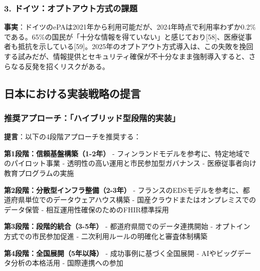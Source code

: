 \documentclass[
  a4paper,
  a4paper,
  11pt]{ltjsbook}
\begin{document}
\subsubsection{3.
ドイツ：オプトアウト方式の課題}\label{ux30c9ux30a4ux30c4ux30aaux30d7ux30c8ux30a2ux30a6ux30c8ux65b9ux5f0fux306eux8ab2ux984c}

\textbf{事実}：ドイツのePAは2021年から利用可能だが、2024年時点で利用率わずか0.2\%である。65\%の国民が「十分な情報を得ていない」と感じており{[}58{]}、医療従事者も抵抗を示している{[}59{]}。2025年のオプトアウト方式導入は、この失敗を挽回する試みだが、情報提供とセキュリティ確保が不十分なまま強制導入すると、さらなる反発を招くリスクがある。

\subsection{日本における実装戦略の提言}\label{ux65e5ux672cux306bux304aux3051ux308bux5b9fux88c5ux6226ux7565ux306eux63d0ux8a00}

\subsubsection{推奨アプローチ：「ハイブリッド型段階的実装」}\label{ux63a8ux5968ux30a2ux30d7ux30edux30fcux30c1ux30cfux30a4ux30d6ux30eaux30c3ux30c9ux578bux6bb5ux968eux7684ux5b9fux88c5}

\begin{tcolorbox}[enhanced jigsaw, toprule=.15mm, bottomtitle=1mm, coltitle=black, left=2mm, opacityback=0, arc=.35mm, colbacktitle=quarto-callout-note-color!10!white, colback=white, opacitybacktitle=0.6, bottomrule=.15mm, rightrule=.15mm, breakable, title=\textcolor{quarto-callout-note-color}{\faInfo}\hspace{0.5em}{Note}, toptitle=1mm, titlerule=0mm, colframe=quarto-callout-note-color-frame, leftrule=.75mm]

\textbf{提言}：以下の4段階アプローチを推奨する：

\textbf{第1段階：信頼基盤構築（1-2年）} -
フィンランドモデルを参考に、特定地域でのパイロット事業 -
透明性の高い運用と市民参加型ガバナンス -
医療従事者向け教育プログラムの実施

\textbf{第2段階：分散型インフラ整備（2-3年）} -
フランスのEDSモデルを参考に、都道府県単位でのデータウェアハウス構築 -
国産クラウドまたはオンプレミスでのデータ保管 -
相互運用性確保のためのFHIR標準採用

\textbf{第3段階：段階的統合（3-5年）} - 都道府県間でのデータ連携開始 -
オプトイン方式での市民参加促進 - 二次利用ルールの明確化と審査体制構築

\textbf{第4段階：全国展開（5年以降）} - 成功事例に基づく全国展開 -
AIやビッグデータ分析の本格活用 - 国際連携への参加

\end{tcolorbox}
\end{document}
